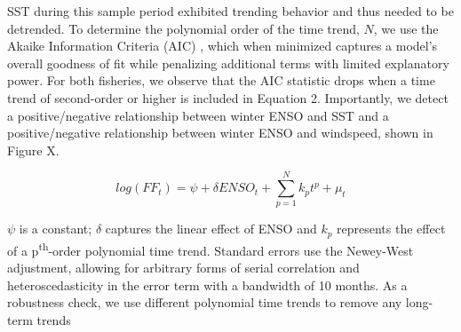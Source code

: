 \documentclass[]{article}
\begin{document}
SST during this sample period exhibited trending behavior and thus
needed to be detrended. To determine the polynomial order of the time
trend, \(N\), we use the Akaike Information Criteria (AIC)
\citep{akaike_1974}, which when minimized captures a model's overall
goodness of fit while penalizing additional terms with limited
explanatory power. For both fisheries, we observe that the AIC statistic
drops when a time trend of second-order or higher is included in
Equation 2. Importantly, we detect a positive/negative relationship
between winter ENSO and SST and a positive/negative relationship between
winter ENSO and windspeed, shown in Figure X.

\[log(FF_t) = \psi + \delta ENSO_t + \sum_{p = 1}^{N}{k_pt^p} + \mu_t\]

\(\psi\) is a constant; \(\delta\) captures the linear effect of ENSO
and \(k_p\) represents the effect of a p\textsuperscript{th}-order
polynomial time trend. Standard errors use the Newey-West adjustment,
allowing for arbitrary forms of serial correlation and
heteroscedasticity in the error term with a bandwidth of 10 months. As a
robustness check, we use different polynomial time trends to remove any
long-term trends
\end{document}

